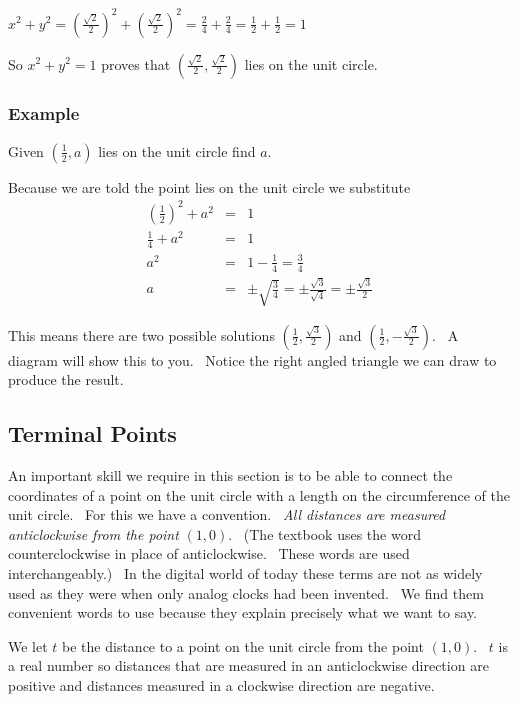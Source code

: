 $x^{2} +y^{2} =\genfrac{(}{)}{}{}{\sqrt{2}}{2}^{2} +\genfrac{(}{)}{}{}{\sqrt{2}}{2}^{2} =\frac{2}{4} +\frac{2}{4} =\frac{1}{2} +\frac{1}{2} =1$ 

So $x^{2} +y^{2} =1$ proves that $\left (\frac{\sqrt{2}}{2} ,\frac{\sqrt{2}}{2}\right )$ lies on the unit circle. 

\subsubsection{Example}
Given $\left (\frac{1}{2} ,a\right )$ lies on the unit circle find $a$. 

Because we are told the point lies on the unit circle we substitute
\begin{eqnarray*}\genfrac{(}{)}{}{}{1}{2}^{2} +a^{2} &  = & 1 \\
\frac{1}{4} +a^{2} &  = & 1 \\
a^{2} &  = & 1 -\frac{1}{4} =\frac{3}{4} \\
a &  = &  \pm \sqrt{\frac{3}{4}} = \pm \frac{\sqrt{3}}{\sqrt{4}} = \pm \frac{\sqrt{3}}{2}\end{eqnarray*}

This means there are two possible solutions $\left (\frac{1}{2} ,\frac{\sqrt{3}}{2}\right )$ and $\left (\frac{1}{2} , -\frac{\sqrt{3}}{2}\right )$. \ A diagram will show
this to you. \ Notice the right angled triangle we can draw to produce the result. 


\subsection{Terminal Points}
An important skill we require in this section is to be able to connect the coordinates of a point on the unit circle with a length on the circumference
of the unit circle. \ For this we have a convention. \ \emph{All
distances are measured anticlockwise from the point }$\left (1 ,0\right )$. \ (The textbook uses
the word counterclockwise in place of anticlockwise. \ These words are used interchangeably.) \ In
the digital world of today these terms are not as widely used as they were when only analog clocks had been invented. \ We
find them convenient words to use because they explain precisely what we want to say. 

We let $t$ be the distance to a point on the unit circle from the point $\left (1 ,0\right )$. \ $t$ is a real number so distances that are measured in an anticlockwise direction are positive and distances measured in a clockwise
direction are negative. 


